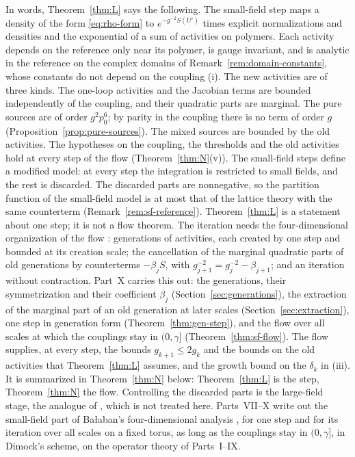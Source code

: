 In words, Theorem~\ref{thm:L} says the following. The small-field step maps a density of the form \eqref{eq:rho-form} to $e^{-g^{-2}S(U')}$ times explicit normalizations and densities and the exponential of a sum of activities on polymers. Each activity depends on the reference only near its polymer, is gauge invariant, and is analytic in the reference on the complex domains of Remark~\ref{rem:domain-constants}, whose constants do not depend on the coupling (i). The new activities are of three kinds. The one-loop activities and the Jacobian terms are bounded independently of the coupling, and their quadratic parts are marginal. The pure sources are of order $g^2p_0^6$; by parity in the coupling there is no term of order $g$ (Proposition~\ref{prop:pure-sources}). The mixed sources are bounded by the old activities. The hypotheses on the coupling, the thresholds and the old activities hold at every step of the flow (Theorem~\ref{thm:N}(v)). The small-field steps define a modified model: at every step the integration is restricted to small fields, and the rest is discarded. The discarded parts are nonnegative, so the partition function of the small-field model is at most that of the lattice theory with the same counterterm (Remark~\ref{rem:sf-reference}). Theorem~\ref{thm:L} is a statement about one step; it is not a flow theorem. The iteration needs the four-dimensional organization of the flow \cite{BalYM4I,BalYM4II}: generations of activities, each created by one step and bounded at its creation scale; the cancellation of the marginal quadratic parts of old generations by counterterms $-\beta_jS$, with $g_{j+1}^{-2}=g_j^{-2}-\beta_{j+1}$; and an iteration without contraction. Part~X carries this out: the generations, their symmetrization and their coefficient $\beta_j$ (Section~\ref{sec:generations}), the extraction of the marginal part of an old generation at later scales (Section~\ref{sec:extraction}), one step in generation form (Theorem~\ref{thm:gen-step}), and the flow over all scales at which the couplings stay in $(0,\gamma]$ (Theorem~\ref{thm:sf-flow}). The flow supplies, at every step, the bounds $g_{k+1}\le2g_k$ and the bounds on the old activities that Theorem~\ref{thm:L} assumes, and the growth bound on the $\delta_k$ in (iii). It is summarized in Theorem~\ref{thm:N} below: Theorem~\ref{thm:L} is the step, Theorem~\ref{thm:N} the flow. Controlling the discarded parts is the large-field stage, the analogue of \cite{DimockII,DimockIII}, which is not treated here. Parts~VII--X write out the small-field part of Ba\l aban's four-dimensional analysis \cite{BalYM4I,BalYM4II}, for one step and for its iteration over all scales on a fixed torus, as long as the couplings stay in $(0,\gamma]$, in Dimock's scheme, on the operator theory of Parts~I--IX.

